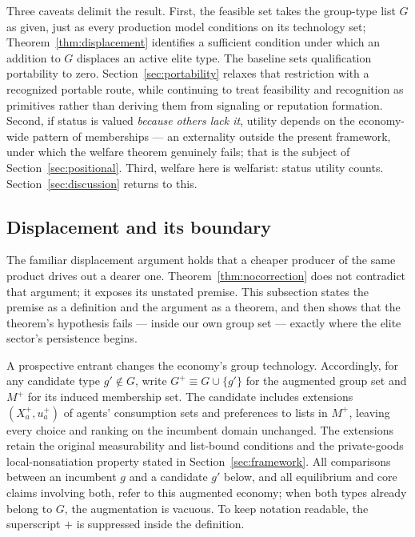 \documentclass[12pt,letterpaper]{article}
\theoremstyle{definition}
\begin{document}
Three caveats delimit the result.
First, the feasible set takes the group-type list $G$ as given, just as every production model conditions on its technology set; Theorem~\ref{thm:displacement} identifies a sufficient condition under which an addition to $G$ displaces an active elite type.
The baseline sets qualification portability to zero.
Section~\ref{sec:portability} relaxes that restriction with a recognized portable route,
while continuing to treat feasibility and recognition as primitives rather than deriving
them from signaling or reputation formation.
Second, if status is valued \emph{because others lack it}, utility depends on the economy-wide pattern of memberships --- an externality outside the present framework, under which the welfare theorem genuinely fails; that is the subject of Section~\ref{sec:positional}.
Third, welfare here is welfarist: status utility counts.
Section~\ref{sec:discussion} returns to this.

\subsection{Displacement and its boundary}\label{sec:displacement}

The familiar displacement argument holds that a cheaper producer of the same product drives out a dearer one.
Theorem~\ref{thm:nocorrection} does not contradict that argument; it exposes its unstated premise.
This subsection states the premise as a definition and the argument as a theorem, and then shows that the theorem's hypothesis fails --- inside our own group set --- exactly where the elite sector's persistence begins.

A prospective entrant changes the economy's group technology.
Accordingly, for any candidate type $g'\notin G$, write $G^+\equiv G\cup\{g'\}$ for the augmented group set and $M^+$ for its induced membership set.
The candidate includes extensions $(X_a^+,u_a^+)$ of agents' consumption sets and preferences to lists in $M^+$, leaving every choice and ranking on the incumbent domain unchanged.
The extensions retain the original measurability and list-bound conditions and the private-goods local-nonsatiation property stated in Section~\ref{sec:framework}.
All comparisons between an incumbent $g$ and a candidate $g'$ below, and all equilibrium and core claims involving both, refer to this augmented economy; when both types already belong to $G$, the augmentation is vacuous.
To keep notation readable, the superscript $+$ is suppressed inside the definition.
\end{document}
